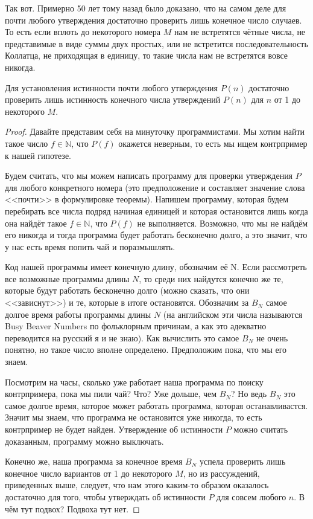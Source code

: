 Так вот. Примерно 50 лет тому назад было доказано, что на самом деле для почти любого утверждения достаточно проверить лишь конечное число случаев. То есть если вплоть до некоторого номера $M$ нам не встретятся чётные числа, не представимые в виде суммы двух простых, или не встретится последовательность Коллатца, не приходящая в единицу, то такие числа нам не встретятся вовсе никогда.

\begin{thm}
Для установления истинности почти любого утверждения $P(n)$ достаточно проверить лишь истинность конечного числа утверждений $P(n)$ для $n$ от 1 до некоторого $M$.
\end{thm}
\begin{proof}
Давайте представим себя на минуточку программистами. Мы хотим найти такое число $f\in\mathbb{N}$, что $P(f)$ окажется неверным, то есть мы ищем контрпример к нашей гипотезе.

Будем считать, что мы можем написать программу для проверки утверждения $P$ для любого конкретного номера (это предположение и составляет значение слова <<почти>> в формулировке теоремы). Напишем программу, которая будем перебирать все числа подряд начиная единицей и которая остановится лишь когда она найдёт такое $f\in\mathbb{N}$, что $P(f)$ не выполняется. Возможно, что мы не найдём его никогда и тогда программа будет работать бесконечно долго, а это значит, что у нас есть время попить чай и поразмышлять.

Код нашей программы имеет конечную длину, обозначим её N. Если рассмотреть все возможные программы длины $N$, то среди них найдутся конечно же те, которые будут работать бесконечно долго (можно сказать, что они <<зависнут>>) и те, которые в итоге остановятся. Обозначим за $B_N$ самое долгое время работы программы длины $N$ (на английском эти числа называются Busy Beaver Numbers по фольклорным причинам, а как это адекватно переводится на русский я и не знаю). Как вычислить это самое $B_N$ не очень понятно, но такое число вполне определено. Предположим пока, что мы его знаем.

Посмотрим на часы, сколько уже работает наша программа по поиску контрпримера, пока мы пили чай? Что? Уже дольше, чем $B_N$? Но ведь $B_N$ это самое долгое время, которое может работать программа, которая останавливастся. Значит мы знаем, что программа не остановится уже никогда, то есть контрпример не будет найден. Утверждение об истинности $P$ можно считать доказанным, программу можно выключать.

Конечно же, наша программа за конечное время $B_N$ успела проверить лишь конечное число вариантов от 1 до некоторого $M$, но из рассуждений, приведенных выше, следует, что нам этого каким-то образом оказалось достаточно для того, чтобы утверждать об истинности $P$ для совсем любого $n$. В чём тут подвох? Подвоха тут нет. 
\end{proof}

